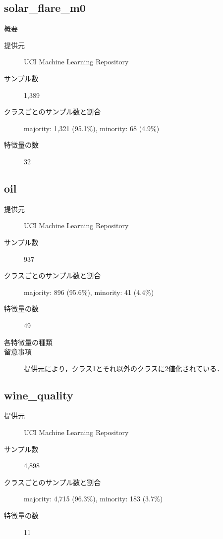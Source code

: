 \subsection{solar\_flare\_m0}
\begin{description}
    \item[概要] \cite{}
    \item[提供元] UCI Machine Learning Repository
    \item[サンプル数] 1,389
    \item[クラスごとのサンプル数と割合] majority: 1,321 (95.1\%), minority: 68 (4.9\%) 

    \item[特徴量の数] 32
\end{description}

\subsection{oil}
\begin{description}
    \item[提供元] UCI Machine Learning Repository
    \item[サンプル数] 937
    \item[クラスごとのサンプル数と割合] majority: 896 (95.6\%), minority: 41 (4.4\%)

    \item[特徴量の数] 49
    \item[各特徴量の種類] \mbox{}
        
    \item[留意事項] 提供元により，クラス1とそれ以外のクラスに2値化されている．
\end{description}


\subsection{wine\_quality}
\begin{description}
    \item[提供元] UCI Machine Learning Repository
    \item[サンプル数] 4,898
    \item[クラスごとのサンプル数と割合] majority: 4,715 (96.3\%), minority: 183 (3.7\%)

    \item[特徴量の数] 11
\end{description}


